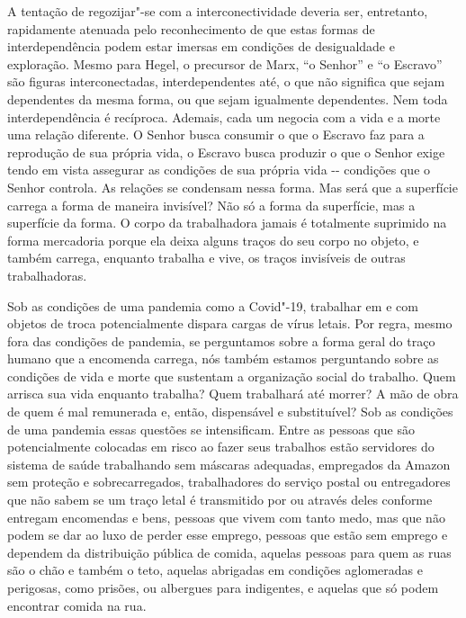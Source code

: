 A tentação de regozijar"-se com a interconectividade deveria ser,
entretanto, rapidamente atenuada pelo reconhecimento de que estas formas
de interdependência podem estar imersas em condições de desigualdade e
exploração. Mesmo para Hegel, o precursor de Marx, ``o Senhor'' e ``o
Escravo'' são figuras interconectadas, interdependentes até, o que não
significa que sejam dependentes da mesma forma, ou que sejam igualmente
dependentes. Nem toda interdependência é recíproca. Ademais, cada um
negocia com a vida e a morte uma relação diferente. O Senhor busca
consumir o que o Escravo faz para a reprodução de sua própria vida, o
Escravo busca produzir o que o Senhor exige tendo em vista assegurar as
condições de sua própria vida -\/- condições que o Senhor controla. As
relações se condensam nessa forma. Mas será que a superfície carrega a
forma de maneira invisível? Não só a forma da superfície, mas a
superfície da forma. O corpo da trabalhadora jamais é totalmente
suprimido na forma mercadoria porque ela deixa alguns traços do seu
corpo no objeto, e também carrega, enquanto trabalha e vive, os traços
invisíveis de outras trabalhadoras.

Sob as condições de uma pandemia como a Covid"-19, trabalhar em e com
objetos de troca potencialmente dispara cargas de vírus letais. Por
regra, mesmo fora das condições de pandemia, se perguntamos sobre a
forma geral do traço humano que a encomenda carrega, nós também estamos
perguntando sobre as condições de vida e morte que sustentam a
organização social do trabalho. Quem arrisca sua vida enquanto trabalha?
Quem trabalhará até morrer? A mão de obra de quem é mal remunerada e,
então, dispensável e substituível? Sob as condições de uma pandemia
essas questões se intensificam. Entre as pessoas que são potencialmente
colocadas em risco ao fazer seus trabalhos estão servidores do sistema
de saúde trabalhando sem máscaras adequadas, empregados da Amazon sem
proteção e sobrecarregados, trabalhadores do serviço postal ou
entregadores {} que não sabem se um traço letal é
transmitido por ou através deles conforme entregam encomendas e bens,
pessoas que vivem com tanto medo, mas que não podem se dar ao luxo de
perder esse emprego, pessoas que estão sem emprego e dependem da
distribuição pública de comida, aquelas pessoas para quem as ruas são o
chão e também o teto, aquelas abrigadas em condições aglomeradas e
perigosas, como prisões, ou albergues para indigentes, e aquelas que só
podem encontrar comida na rua.

